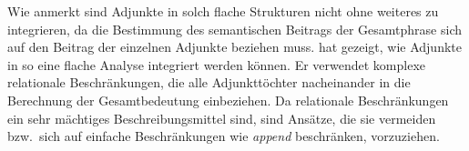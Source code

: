 Wie \citet[]{Netter92} anmerkt sind Adjunkte in solch flache Strukturen nicht ohne weiteres zu
integrieren, da die Bestimmung des semantischen Beitrags der Gesamtphrase sich auf den Beitrag
der einzelnen Adjunkte beziehen muss. \citet{Kasper94a} hat gezeigt, wie Adjunkte in so eine flache
Analyse integriert werden können. Er verwendet komplexe relationale Beschränkungen, die alle
Adjunkttöchter nacheinander in die Berechnung der Gesamtbedeutung einbeziehen. Da relationale
Beschränkungen ein sehr mächtiges Beschreibungsmittel sind, sind Ansätze, die sie vermeiden bzw.\
sich auf einfache Beschränkungen wie \emph{append} beschränken, vorzuziehen.

